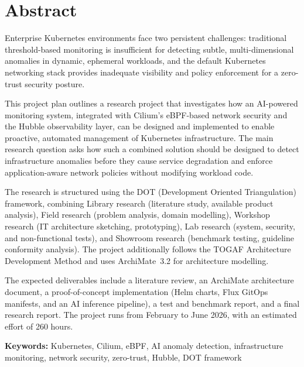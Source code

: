 \chapter*{Abstract}

Enterprise Kubernetes environments face two persistent challenges: traditional threshold-based monitoring is insufficient for detecting subtle, multi-dimensional anomalies in dynamic, ephemeral workloads, and the default Kubernetes networking stack provides inadequate visibility and policy enforcement for a zero-trust security posture.

This project plan outlines a research project that investigates how an AI-powered monitoring system, integrated with Cilium's eBPF-based network security and the Hubble observability layer, can be designed and implemented to enable proactive, automated management of Kubernetes infrastructure. The main research question asks how such a combined solution should be designed to detect infrastructure anomalies before they cause service degradation and enforce application-aware network policies without modifying workload code.

The research is structured using the DOT (Development Oriented Triangulation) framework, combining Library research (literature study, available product analysis), Field research (problem analysis, domain modelling), Workshop research (IT architecture sketching, prototyping), Lab research (system, security, and non-functional tests), and Showroom research (benchmark testing, guideline conformity analysis). The project additionally follows the TOGAF Architecture Development Method and uses ArchiMate~3.2 for architecture modelling.

The expected deliverables include a literature review, an ArchiMate architecture document, a proof-of-concept implementation (Helm charts, Flux GitOps manifests, and an AI inference pipeline), a test and benchmark report, and a final research report. The project runs from February to June 2026, with an estimated effort of 260 hours.

\textbf{Keywords:} Kubernetes, Cilium, eBPF, AI anomaly detection, infrastructure monitoring, network security, zero-trust, Hubble, DOT framework
